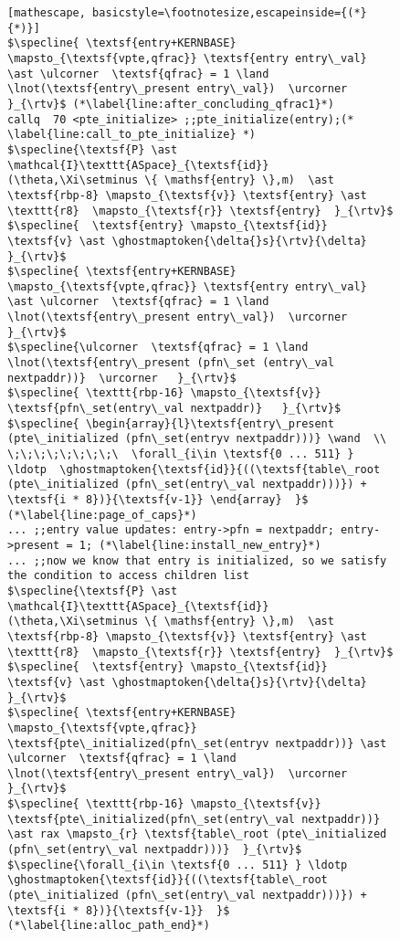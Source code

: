 \begin{figure}
\begin{lstlisting}[mathescape, basicstyle=\footnotesize,escapeinside={(*}{*)}]
$\specline{ \textsf{entry+KERNBASE} \mapsto_{\textsf{vpte,qfrac}} \textsf{entry entry\_val} \ast \ulcorner  \textsf{qfrac} = 1 \land \lnot(\textsf{entry\_present entry\_val})  \urcorner }_{\rtv}$ (*\label{line:after_concluding_qfrac1}*)
callq  70 <pte_initialize> ;;pte_initialize(entry);(* \label{line:call_to_pte_initialize} *)
$\specline{\textsf{P} \ast \mathcal{I}\texttt{ASpace}_{\textsf{id}}(\theta,\Xi\setminus \{ \mathsf{entry} \},m)  \ast \textsf{rbp-8} \mapsto_{\textsf{v}} \textsf{entry} \ast \texttt{r8}  \mapsto_{\textsf{r}} \textsf{entry}  }_{\rtv}$
$\specline{  \textsf{entry} \mapsto_{\textsf{id}} \textsf{v} \ast \ghostmaptoken{\delta{}s}{\rtv}{\delta} }_{\rtv}$
$\specline{ \textsf{entry+KERNBASE} \mapsto_{\textsf{vpte,qfrac}} \textsf{entry entry\_val} \ast \ulcorner  \textsf{qfrac} = 1 \land \lnot(\textsf{entry\_present entry\_val})  \urcorner }_{\rtv}$
$\specline{\ulcorner  \textsf{qfrac} = 1 \land \lnot(\textsf{entry\_present (pfn\_set (entry\_val nextpaddr))}  \urcorner   }_{\rtv}$
$\specline{ \texttt{rbp-16} \mapsto_{\textsf{v}} \textsf{pfn\_set(entry\_val nextpaddr)}   }_{\rtv}$
$\specline{ \begin{array}{l}\textsf{entry\_present (pte\_initialized (pfn\_set(entryv nextpaddr)))} \wand  \\ \;\;\;\;\;\;\;\;\  \forall_{i\in \textsf{0 ... 511} } \ldotp  \ghostmaptoken{\textsf{id}}{((\textsf{table\_root (pte\_initialized (pfn\_set(entry\_val nextpaddr)))}) + \textsf{i * 8})}{\textsf{v-1}} \end{array}  }$ (*\label{line:page_of_caps}*)
... ;;entry value updates: entry->pfn = nextpaddr; entry->present = 1; (*\label{line:install_new_entry}*)
... ;;now we know that entry is initialized, so we satisfy the condition to access children list
$\specline{\textsf{P} \ast \mathcal{I}\texttt{ASpace}_{\textsf{id}}(\theta,\Xi\setminus \{ \mathsf{entry} \},m)  \ast \textsf{rbp-8} \mapsto_{\textsf{v}} \textsf{entry} \ast \texttt{r8}  \mapsto_{\textsf{r}} \textsf{entry}  }_{\rtv}$
$\specline{  \textsf{entry} \mapsto_{\textsf{id}} \textsf{v} \ast \ghostmaptoken{\delta{}s}{\rtv}{\delta} }_{\rtv}$
$\specline{ \textsf{entry+KERNBASE} \mapsto_{\textsf{vpte,qfrac}}  \textsf{pte\_initialized(pfn\_set(entryv nextpaddr))} \ast \ulcorner  \textsf{qfrac} = 1 \land \lnot(\textsf{entry\_present entry\_val})  \urcorner }_{\rtv}$
$\specline{ \texttt{rbp-16} \mapsto_{\textsf{v}} \textsf{pte\_initialized(pfn\_set(entry\_val nextpaddr))}  \ast rax \mapsto_{r} \textsf{table\_root (pte\_initialized (pfn\_set(entry\_val nextpaddr)))}  }_{\rtv}$
$\specline{\forall_{i\in \textsf{0 ... 511} } \ldotp  \ghostmaptoken{\textsf{id}}{((\textsf{table\_root (pte\_initialized (pfn\_set(entry\_val nextpaddr)))}) + \textsf{i * 8})}{\textsf{v-1}}  }$ (*\label{line:alloc_path_end}*)

\end{lstlisting}
\end{figure}
